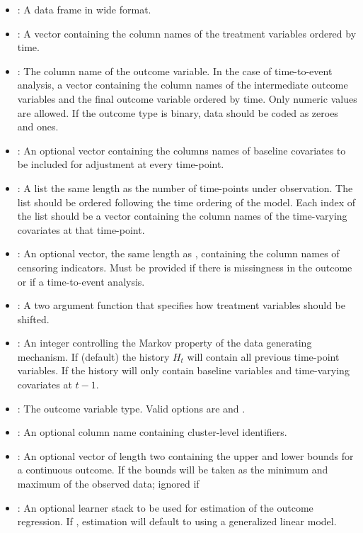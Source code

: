 \documentclass[]{jss}
\begin{document}
\begin{itemize}
  \item {}: A data frame in wide format. 
  \item {}: A vector containing the column names of the treatment variables ordered by time.
  \item {}: The column name of the outcome variable. In the case of time-to-event 
  analysis, a vector containing the column names of the intermediate outcome variables and
  the final outcome variable ordered by time. Only numeric values are allowed. If
  the outcome type is binary, data should be coded as zeroes and ones.
  \item {}: An optional vector containing the columns names of baseline covariates
  to be included for adjustment at every time-point.
  \item {}: A list the same length as the number of time-points under observation.
  The list should be ordered following the time ordering of the model.
  Each index of the list should be a vector containing the column names of the time-varying covariates
  at that time-point. 
  \item {}: An optional vector, the same length as , containing
  the column names of censoring indicators. Must be provided if there is missingness in the outcome or
  if a time-to-event analysis.
  \item {}: A two argument function that specifies how treatment variables should be shifted.
  \item {}: An integer controlling the Markov property of the data generating mechanism. If 
  (default) the history \(H_t\) will contain all previous time-point variables. If  the history will
  only contain baseline variables and time-varying covariates at \(t - 1\).
  \item {}: The outcome variable type. Valid options are  and .
  \item {}: An optional column name containing cluster-level identifiers.
  \item {}: An optional vector of length two containing the upper and lower bounds
  for a continuous outcome. If  the bounds will be taken as the minimum and maximum
   of the observed data; ignored if 
  \item {}: An optional  learner stack to be used for estimation
  of the outcome regression. If , estimation will default to using a generalized linear model.

\end{itemize}
\end{document}
